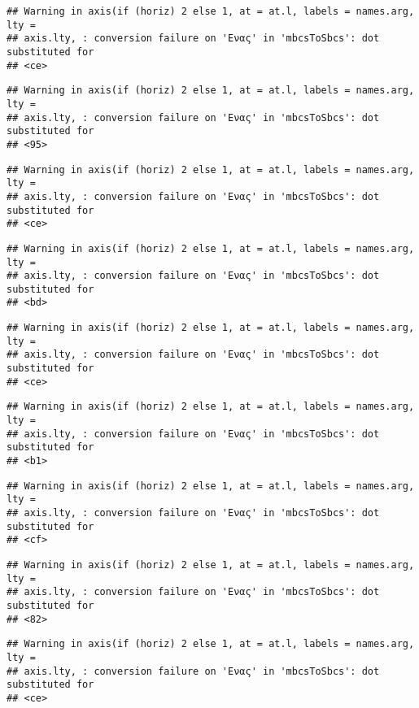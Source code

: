 \documentclass[
]{article}
\begin{document}
\begin{verbatim}
## Warning in axis(if (horiz) 2 else 1, at = at.l, labels = names.arg, lty =
## axis.lty, : conversion failure on 'Ενας' in 'mbcsToSbcs': dot substituted for
## <ce>
\end{verbatim}

\begin{verbatim}
## Warning in axis(if (horiz) 2 else 1, at = at.l, labels = names.arg, lty =
## axis.lty, : conversion failure on 'Ενας' in 'mbcsToSbcs': dot substituted for
## <95>
\end{verbatim}

\begin{verbatim}
## Warning in axis(if (horiz) 2 else 1, at = at.l, labels = names.arg, lty =
## axis.lty, : conversion failure on 'Ενας' in 'mbcsToSbcs': dot substituted for
## <ce>
\end{verbatim}

\begin{verbatim}
## Warning in axis(if (horiz) 2 else 1, at = at.l, labels = names.arg, lty =
## axis.lty, : conversion failure on 'Ενας' in 'mbcsToSbcs': dot substituted for
## <bd>
\end{verbatim}

\begin{verbatim}
## Warning in axis(if (horiz) 2 else 1, at = at.l, labels = names.arg, lty =
## axis.lty, : conversion failure on 'Ενας' in 'mbcsToSbcs': dot substituted for
## <ce>
\end{verbatim}

\begin{verbatim}
## Warning in axis(if (horiz) 2 else 1, at = at.l, labels = names.arg, lty =
## axis.lty, : conversion failure on 'Ενας' in 'mbcsToSbcs': dot substituted for
## <b1>
\end{verbatim}

\begin{verbatim}
## Warning in axis(if (horiz) 2 else 1, at = at.l, labels = names.arg, lty =
## axis.lty, : conversion failure on 'Ενας' in 'mbcsToSbcs': dot substituted for
## <cf>
\end{verbatim}

\begin{verbatim}
## Warning in axis(if (horiz) 2 else 1, at = at.l, labels = names.arg, lty =
## axis.lty, : conversion failure on 'Ενας' in 'mbcsToSbcs': dot substituted for
## <82>
\end{verbatim}

\begin{verbatim}
## Warning in axis(if (horiz) 2 else 1, at = at.l, labels = names.arg, lty =
## axis.lty, : conversion failure on 'Ενας' in 'mbcsToSbcs': dot substituted for
## <ce>
\end{verbatim}
\end{document}
